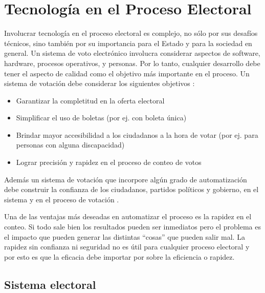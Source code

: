 \chapter{Tecnología en el Proceso Electoral}
\label{SistemaElectoral}

Involucrar tecnología en el proceso electoral es complejo, no sólo por sus desafíos técnicos, sino también por su importancia para el Estado y para la sociedad en general. Un sistema de voto electrónico involucra considerar aspectos de software, hardware, procesos operativos, y personas. Por lo tanto, cualquier desarrollo debe tener el aspecto de calidad como el objetivo más importante en el proceso.\newline
Un sistema de votación debe considerar los siguientes objetivos \cite{conicet}:
\begin{itemize}
    \item Garantizar la completitud en la oferta electoral
    \item Simplificar el uso de boletas (por ej. con boleta única)
    \item Brindar mayor accesibilidad a los ciudadanos a la hora de votar (por ej. para personas con alguna discapacidad)
    \item Lograr precisión y rapidez en el proceso de conteo de votos
\end{itemize}
Además un sistema de votación que incorpore algún grado de automatización debe construir la confianza de los ciudadanos, partidos políticos y gobierno, en el sistema y en el proceso de votación \cite{conicet}.

Una de las ventajas más deseadas en automatizar el proceso es la rapidez en el conteo. Si todo sale bien los resultados pueden ser inmediatos pero el problema es el impacto que pueden generar las distintas ``cosas'' que pueden salir mal. La rapidez sin confianza ni seguridad no es útil para cualquier proceso electoral y por esto es que la eficacia debe importar por sobre la eficiencia o rapidez.

\section{Sistema electoral}

